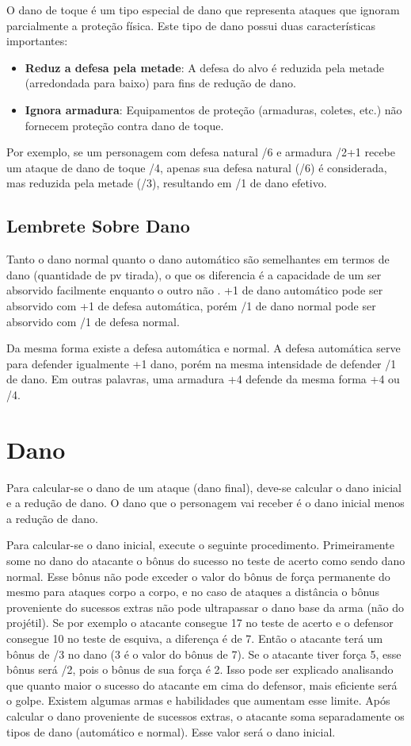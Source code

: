 O dano de toque é um tipo especial de dano que representa ataques que ignoram parcialmente a proteção física. Este tipo de dano possui duas características importantes:

\begin{itemize}
	\item \textbf{Reduz a defesa pela metade}: A defesa do alvo é reduzida pela metade (arredondada para baixo) para fins de redução de dano.
	\item \textbf{Ignora armadura}: Equipamentos de proteção (armaduras, coletes, etc.) não fornecem proteção contra dano de toque.
\end{itemize}

Por exemplo, se um personagem com defesa natural /6 e armadura /2+1 recebe um ataque de dano de toque /4, apenas sua defesa natural (/6) é considerada, mas reduzida pela metade (/3), resultando em /1 de dano efetivo.

\subsection{Lembrete Sobre Dano}

Tanto o dano normal quanto o dano automático são semelhantes em termos de dano (quantidade de pv tirada), o que os diferencia é a capacidade de um ser absorvido facilmente enquanto o outro não . +1 de dano automático pode ser absorvido com +1 de defesa automática, porém /1 de dano normal pode ser absorvido com /1 de defesa normal.

	Da mesma forma existe a defesa automática e normal. A defesa automática serve para defender igualmente +1 dano, porém na mesma intensidade de defender /1 de dano. Em outras palavras, uma armadura +4 defende da mesma forma +4 ou /4.
	
\section{Dano}

Para calcular-se o dano de um ataque (dano final), deve-se calcular o dano inicial e a redução de dano. O dano que o personagem vai receber é o dano inicial menos a redução de dano. 

Para calcular-se o dano inicial, execute o seguinte procedimento. Primeiramente some no dano do atacante o bônus do sucesso no teste de acerto como sendo dano normal. Esse bônus não pode exceder o valor do bônus de força permanente do mesmo para ataques corpo a corpo, e no caso de ataques a distância o bônus proveniente do sucessos extras não pode ultrapassar o dano base da arma (não do projétil). Se por exemplo o atacante consegue 17 no teste de acerto e o defensor consegue 10 no teste de esquiva, a diferença é de 7. Então o atacante terá um bônus de /3 no dano (3 é o valor do bônus de 7). Se o atacante tiver força 5, esse bônus será /2, pois o bônus de sua força é 2. Isso pode ser explicado analisando que quanto maior o sucesso do atacante em cima do defensor, mais eficiente será o golpe. Existem algumas armas e habilidades que aumentam esse limite. Após calcular o dano proveniente de sucessos extras, o atacante soma separadamente os tipos de dano (automático e normal). Esse valor será o dano inicial.


